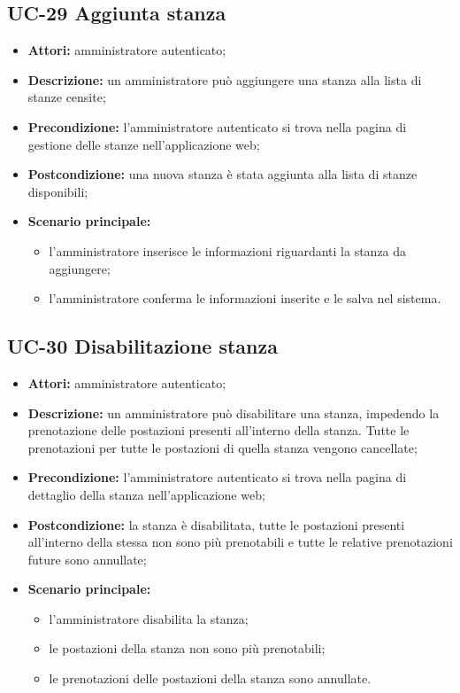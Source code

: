 \subsection{UC-29 Aggiunta stanza}
\begin{itemize}
    \item \textbf{Attori:} amministratore autenticato;
    \item \textbf{Descrizione:} un amministratore pu\`{o} aggiungere una stanza alla lista di stanze censite;
    \item \textbf{Precondizione:} l'amministratore autenticato si trova nella pagina di gestione delle stanze nell'applicazione web;
    \item \textbf{Postcondizione:} una nuova stanza \`{e} stata aggiunta alla lista di stanze disponibili;
    \item \textbf{Scenario principale:}
    \begin{itemize}
        \item l'amministratore inserisce le informazioni riguardanti la stanza da aggiungere;
        \item l'amministratore conferma le informazioni inserite e le salva nel sistema.
    \end{itemize}
\end{itemize}


\subsection{UC-30 Disabilitazione stanza}
\begin{itemize}
    \item \textbf{Attori:} amministratore autenticato;
    \item \textbf{Descrizione:} un amministratore pu\`{o} disabilitare una stanza, impedendo la prenotazione delle postazioni presenti all'interno della stanza. Tutte le prenotazioni per tutte le postazioni di quella stanza vengono cancellate;
    \item \textbf{Precondizione:} l'amministratore autenticato si trova nella pagina di dettaglio della stanza nell'applicazione web;
    \item \textbf{Postcondizione:} la stanza \`{e} disabilitata, tutte le postazioni presenti all'interno della stessa non sono pi\`{u} prenotabili e tutte le relative prenotazioni future sono annullate;
    \item \textbf{Scenario principale:}
    \begin{itemize}
        \item l'amministratore disabilita la stanza;
        \item le postazioni della stanza non sono pi\`{u} prenotabili;
        \item le prenotazioni delle postazioni della stanza sono annullate.
    \end{itemize}
\end{itemize}



